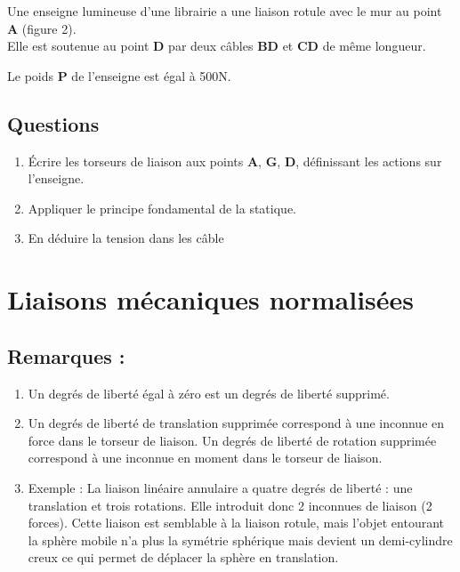 \documentclass[
]{book}
\providecommand{\tightlist}{%
  \setlength{\itemsep}{0pt}\setlength{\parskip}{0pt}}
\begin{document}
Une enseigne lumineuse d'une librairie a une liaison rotule avec le mur au point \textbf{A} (figure 2).\\
Elle est soutenue au point \textbf{D} par deux câbles \textbf{BD} et \textbf{CD} de même longueur.

Le poids \textbf{P} de l'enseigne est égal à 500N.

\hypertarget{questions-2}{%
\subsection*{Questions}\label{questions-2}}

\begin{enumerate}
\def\labelenumi{\arabic{enumi}.}
\tightlist
\item
  Écrire les torseurs de liaison aux points \textbf{A}, \textbf{G}, \textbf{D}, définissant les actions sur l'enseigne.
\item
  Appliquer le principe fondamental de la statique.
\item
  En déduire la tension dans les câble
\end{enumerate}

\hypertarget{liaisons-muxe9caniques-normalisuxe9es}{%
\section{Liaisons mécaniques normalisées}\label{liaisons-muxe9caniques-normalisuxe9es}}

\hypertarget{remarques}{%
\subsection{Remarques :}\label{remarques}}

\begin{enumerate}
\def\labelenumi{\arabic{enumi}.}
\item
  Un degrés de liberté égal à zéro est un degrés de liberté supprimé.
\item
  Un degrés de liberté de translation supprimée correspond à une inconnue en force dans le torseur de liaison.
  Un degrés de liberté de rotation supprimée correspond à une inconnue en moment dans le torseur de liaison.
\item
  Exemple : La liaison linéaire annulaire a quatre degrés de liberté : une translation et trois rotations. Elle introduit donc 2 inconnues de liaison (2 forces).
  Cette liaison est semblable à la liaison rotule, mais l'objet entourant la sphère mobile n'a plus la symétrie sphérique mais devient un demi-cylindre creux ce qui permet de déplacer la sphère en translation.
\end{enumerate}
\end{document}
